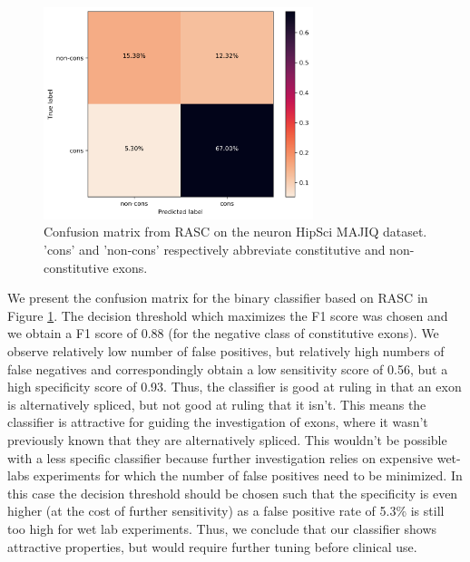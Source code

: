 \begin{figure}
	\centering\includegraphics[width=0.7\textwidth]{../visualizations/ch5-results/confusion_matrix.png} 
	\caption{Confusion matrix from RASC on the neuron HipSci MAJIQ dataset. 'cons' and 'non-cons' respectively abbreviate constitutive and non-constitutive exons. }
	\label{fig:confusion_matrix}
\end{figure}

We present the confusion matrix for the binary classifier based on RASC in Figure \ref{fig:confusion_matrix}. The decision threshold which maximizes the F1 score was chosen and we obtain a F1 score of 0.88 (for the negative class of constitutive exons). We observe relatively low number of false positives, but relatively high numbers of false negatives and correspondingly obtain a low sensitivity score of 0.56, but a high specificity score of 0.93. Thus, the classifier is good at ruling in that an exon is alternatively spliced, but not good at ruling that it isn't. This means the classifier is attractive for guiding the investigation of exons, where it wasn't previously known that they are alternatively spliced. This wouldn't be possible with a less specific classifier because further investigation relies on expensive wet-labs experiments for which the number of false positives need to be minimized. In this case the decision threshold should be chosen such that the specificity is even higher (at the cost of further sensitivity) as a false positive rate of 5.3\% is still too high for wet lab experiments. Thus, we conclude that our classifier shows attractive properties, but would require further tuning before clinical use. 




